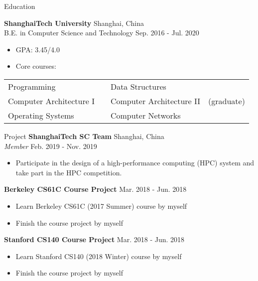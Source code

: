 \documentclass{resume} %
\begin{document}

\begin{rSection}{Education}

{\bf ShanghaiTech University} \hfill {Shanghai, China} 
\\ B.E. in Computer Science and Technology \hfill {Sep. 2016 - Jul. 2020}
\begin{itemize}
    \item GPA: 3.45/4.0
    \item Core courses:
\end{itemize}
\begin{center}
\begin{tabular}{llll}
Programming & & Data Structures &\\
Computer Architecture I & & Computer Architecture II & (graduate)\\
Operating Systems & & Computer Networks & \\
\end{tabular}
\end{center}


\end{rSection}

\begin{rSection}{Project}
{\bf ShanghaiTech SC Team} \hfill {Shanghai, China}\\
\textit{Member} \hfill {Feb. 2019 - Nov. 2019}
\begin{itemize}
    \item Participate in the design of a high-performance computing (HPC) system and take part in the HPC competition.
\end{itemize}

{\bf Berkeley CS61C Course Project} \hfill {Mar. 2018 - Jun. 2018}
\begin{itemize}
    \item Learn Berkeley CS61C (2017 Summer) course by myself
    \item Finish the course project by myself
\end{itemize}

{\bf Stanford CS140 Course Project} \hfill {Mar. 2018 - Jun. 2018}
\begin{itemize}
    \item Learn Stanford CS140 (2018 Winter) course by myself
    \item Finish the course project by myself
\end{itemize}
\end{rSection}
\end{document}
